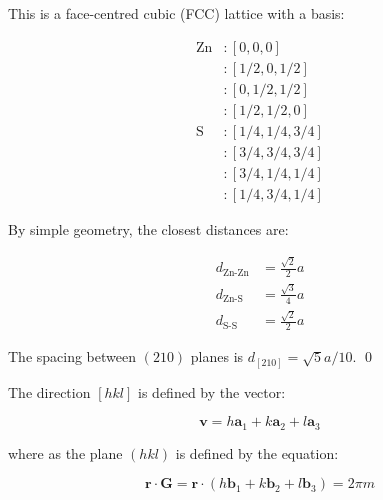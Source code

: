 \documentclass[12pt]{article}
\begin{document}



\pagebreak
\section*{}




This is a face-centred cubic (FCC) lattice with a basis:

\begin{equation}
    \begin{split}
        \text{Zn} & : [0, 0, 0] \\
        & : [1/2, 0, 1/2] \\
        & : [0, 1/2, 1/2] \\
        & : [1/2, 1/2, 0] \\
        \text{S} & : [1/4, 1/4, 3/4] \\
        & : [3/4, 3/4, 3/4] \\
        & : [3/4, 1/4, 1/4] \\
        & : [1/4, 3/4, 1/4]
    \end{split}
\end{equation}

By simple geometry, the closest distances are:

\begin{equation}
    \begin{split}
        d_{\text{Zn-Zn}} & = \frac{\sqrt{2}}{2} a \\
        d_{\text{Zn-S}} & = \frac{\sqrt{3}}{4} a \\
        d_{\text{S-S}} & = \frac{\sqrt{2}}{2} a
    \end{split}
\end{equation}

The spacing between $(210)$ planes is $d_{[210]} = \sqrt{5} a / 10$.
\qed



The direction $[hkl]$ is defined by the vector:

\begin{equation}
    \mathbf{v} = h \mathbf{a}_{1} + k \mathbf{a}_{2} + l \mathbf{a}_{3}
\end{equation}

where as the plane $(hkl)$ is defined by the equation:

\begin{equation}
    \mathbf{r} \cdot \mathbf{G} = \mathbf{r} \cdot (h \mathbf{b}_{1} + k \mathbf{b}_{2} + l \mathbf{b}_{3}) = 2\pi m
\end{equation}
\end{document}
